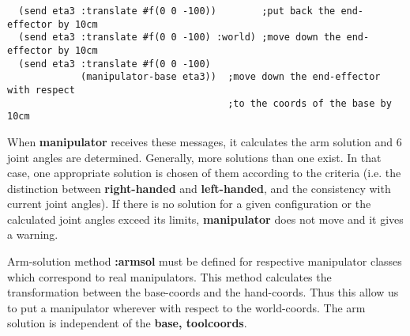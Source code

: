 \begin{verbatim}
  (send eta3 :translate #f(0 0 -100))        ;put back the end-effector by 10cm
  (send eta3 :translate #f(0 0 -100) :world) ;move down the end-effector by 10cm
  (send eta3 :translate #f(0 0 -100)
             (manipulator-base eta3))  ;move down the end-effector with respect 
                                       ;to the coords of the base by 10cm
\end{verbatim}


When {\bf manipulator} receives these messages, it calculates the arm solution 
and 6 joint angles are determined. Generally, more solutions than one exist.
In that case, one appropriate solution is chosen of them according to the 
criteria (i.e. the distinction between {\bf right-handed} and {\bf left-handed},
and the consistency with current joint angles). If there is no solution for 
a given configuration or the calculated joint angles exceed its limits, 
{\bf manipulator} does not move and it gives a warning.


Arm-solution method {\bf :armsol} must be defined for respective manipulator 
classes which correspond to real manipulators. This method calculates the 
transformation between the base-coords and the hand-coords. Thus this allow us 
to put a manipulator wherever with respect to the world-coords. The arm solution 
is independent of the {\bf base, toolcoords}.


